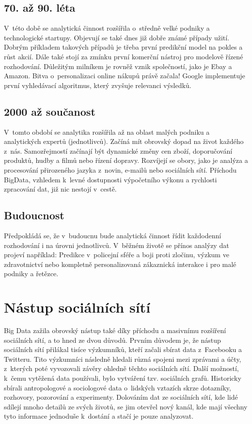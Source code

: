 \subsection{70. až 90. léta}
V~této době se analytická činnost rozšířila o~středně velké podniky a technologické startupy. Objevují se také dnes již dobře známé případy užití. Dobrým příkladem takových případů je třeba první predikční model na pokles a růst akcií. Dále také stojí za zmínku první komerční nástroj pro modelově řízené rozhodování. Důležitým milníkem je rovněž vznik společností, jako je Ebay a Amazon. Bitva o~personalizaci online nákupů právě začala! Google implementuje první vyhledávací algoritmus, který zvyšuje relevanci výsledků.

\subsection{2000 až součanost}
V~tomto období se analytika rozšířila až na oblast malých podniku a analytických expertů (jednotlivců). Začíná mít obrovský dopad na život každého z~nás. Samozřejmostí začínají být dynamické změny cen zboží, doporučování produktů, hudby a filmů nebo řízení dopravy. Rozvíjejí se obory, jako je analýza a procesování přirozeného jazyka z~novin, e-mailů nebo sociálních sítí. Příchodu BigData, vzhledem k~levné dostupnosti výpočetního výkonu a rychlosti zpracování dat, již nic nestojí v~cestě.

\subsection{Budoucnost}
Předpokládá se, že v~budoucnu bude analytická činnost řídit každodenní rozhodování i na úrovni jednotlivců. V~běžném životě se přínos analýzy dat projeví například: Predikce v~policejní sféře a boji proti zločinu, výzkum ve zdravotnictví nebo kompletně personalizovaná zákaznická interakce i pro malé podniky a řetězce. %

\section{Nástup sociálních sítí}
Big Data zažila obrovský nástup také díky příchodu a masivnímu rozšíření sociálních sítí, a to hned ze dvou důvodů. Prvním důvodem je, že nástup sociálních sítí přilákal tisíce výzkumníků, kteří začali sbírat data z~Facebooku a Twitteru. Tito výzkumníci následně hledali různá spojeni mezi zprávami a účty, z~kterých poté vyvozovali závěry ohledně těchto sociálních sítí. Další možností, k~čemu vytěžená data používali, bylo vytváření tzv. sociálních grafů. Historicky sbírali antropologové a sociologové data o~lidských vztazích skrze dotazníky, rozhovory, pozorování a experimenty. Dolováním dat ze sociálních sítí, kde lidé sdílejí mnoho detailů ze svých životů, se jim otevřel nový kanál, kde mají všechny tyto informace jednoduše k~dostání a stačí je pouze analyzovat.

